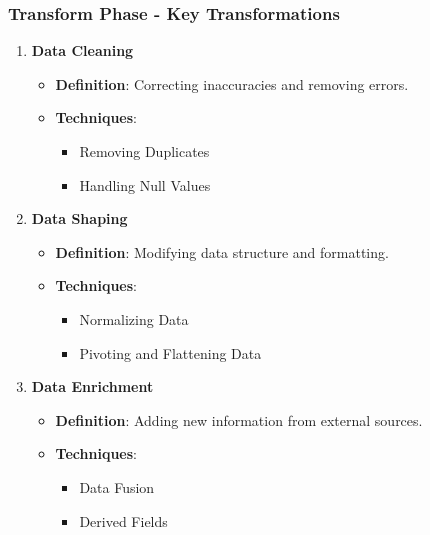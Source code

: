 \documentclass[aspectratio=169]{beamer}
\begin{document}
\begin{frame}[fragile]
    \frametitle{Transform Phase - Key Transformations}
    \begin{enumerate}
        \item \textbf{Data Cleaning}
            \begin{itemize}
                \item \textbf{Definition}: Correcting inaccuracies and removing errors.
                \item \textbf{Techniques}:
                    \begin{itemize}
                        \item Removing Duplicates
                        \item Handling Null Values
                    \end{itemize}
            \end{itemize}
        
        \item \textbf{Data Shaping}
            \begin{itemize}
                \item \textbf{Definition}: Modifying data structure and formatting.
                \item \textbf{Techniques}:
                    \begin{itemize}
                        \item Normalizing Data
                        \item Pivoting and Flattening Data
                    \end{itemize}
            \end{itemize}
        
        \item \textbf{Data Enrichment}
            \begin{itemize}
                \item \textbf{Definition}: Adding new information from external sources.
                \item \textbf{Techniques}:
                    \begin{itemize}
                        \item Data Fusion
                        \item Derived Fields
                    \end{itemize}
            \end{itemize}
    \end{enumerate}
\end{frame}
\end{document}
